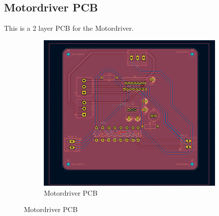 \documentclass[../report.tex]{subfiles}
\begin{document}
\subsection{Motordriver PCB}
This is a 2 layer PCB for the Motordriver. 
\begin{figure}[H]
    \centering
    \begin{subfigure}[b]{0.4\linewidth}
      \includegraphics[width=\linewidth]{image/Screenshot 2023-12-14 at 16.22.46.png}
      \caption{Motordriver PCB} 
    \end{subfigure}
  \end{figure}
    
\end{document}
